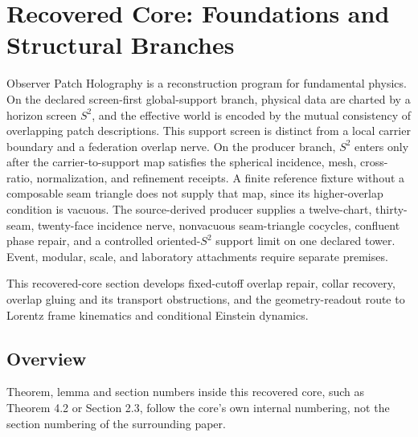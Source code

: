 \section{Recovered Core: Foundations and Structural Branches}\label{observer-patch-holography}

Observer Patch Holography is a reconstruction program for fundamental physics. On the declared
screen-first global-support branch, physical data are charted by a horizon screen \(S^2\), and the
effective world is encoded by the mutual consistency of overlapping patch descriptions. This
support screen is distinct from a local carrier boundary and a federation overlap nerve. On the
producer branch, \(S^2\) enters only after the carrier-to-support map satisfies the spherical
incidence, mesh, cross-ratio, normalization, and refinement receipts. A finite reference
fixture without a composable seam triangle does not supply that map, since its
higher-overlap condition is vacuous. The source-derived producer supplies a
twelve-chart, thirty-seam, twenty-face incidence nerve, nonvacuous seam-triangle cocycles,
confluent phase repair, and a controlled oriented-\(S^2\) support limit on one declared tower.
Event, modular, scale, and laboratory attachments require separate premises.

This recovered-core section develops fixed-cutoff overlap repair, collar recovery, overlap
gluing and its transport obstructions, and the geometry-readout route to Lorentz frame
kinematics and conditional Einstein dynamics.

\subsection{Overview}\label{overview}

Theorem, lemma and section numbers inside this recovered core, such as
Theorem 4.2 or Section 2.3, follow the core's own internal numbering, not the
section numbering of the surrounding paper.

